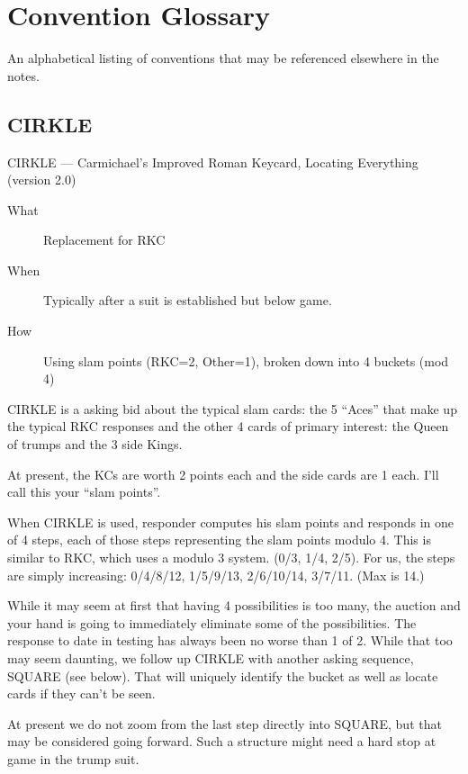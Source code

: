 \documentclass[tom-ari]{subfile}
\begin{document}
\chapter{Convention Glossary}
An alphabetical listing of conventions that may be referenced elsewhere in the notes.

\section{CIRKLE}
\label{CIRKLE}

CIRKLE --- Carmichael's Improved Roman Keycard, Locating Everything (version 2.0)

\normalsize

\begin{description}
	\item[What] Replacement for RKC
	\item[When] Typically after a suit is established but below game.
	\item[How] Using slam points (RKC=2, Other=1), broken down into 4 buckets (mod 4) 
\end{description}

CIRKLE is a asking bid about the typical slam cards:  the 5 ``Aces'' that make up the typical RKC responses and the other 4 cards of primary interest:  the Queen of trumps and the 3 side Kings.

At present, the KCs are worth 2 points each and the side cards are 1 each.  I'll call this your ``slam points''.

When CIRKLE is used, responder computes his slam points and responds in one of 4 steps, each of those steps representing the slam points modulo 4. This is similar to RKC, which uses a modulo 3 system.  (0/3, 1/4, 2/5).  For us, the steps are simply increasing:  0/4/8/12, 1/5/9/13, 2/6/10/14, 3/7/11. (Max is 14.)

While it may seem at first that having 4 possibilities is too many, the auction and your hand is going to immediately eliminate some of the possibilities.  The response to date in testing has always been no worse than 1 of 2.  While that too may seem daunting, we follow up CIRKLE with another asking sequence, SQUARE (see below).  That will uniquely identify the bucket as well as locate cards if they can't be seen.

At present we do not zoom from the last step directly into SQUARE, but that may be considered going forward. Such a structure might need a hard stop at game in the trump suit.
\end{document}

